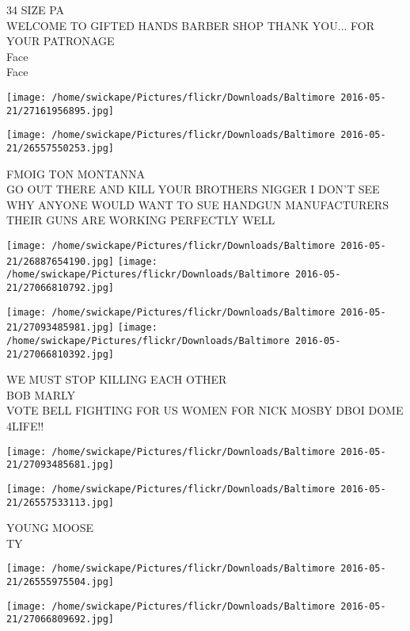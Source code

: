 \documentclass[10pt,letterpaper]{article}
\begin{document}
34 SIZE PA\\
WELCOME TO GIFTED HANDS BARBER SHOP THANK YOU... FOR YOUR PATRONAGE\\
Face\\
Face\\
\pagebreak

\texttt{[image: /home/swickape/Pictures/flickr/Downloads/Baltimore 2016-05-21/27161956895.jpg]}

\vspace{0.25in}
\texttt{[image: /home/swickape/Pictures/flickr/Downloads/Baltimore 2016-05-21/26557550253.jpg]}

FMOIG TON MONTANNA\\
GO OUT THERE AND KILL YOUR BROTHERS NIGGER I DON'T SEE WHY ANYONE WOULD WANT TO SUE HANDGUN MANUFACTURERS THEIR GUNS ARE WORKING PERFECTLY WELL\\
\pagebreak

\texttt{[image: /home/swickape/Pictures/flickr/Downloads/Baltimore 2016-05-21/26887654190.jpg]}
\texttt{[image: /home/swickape/Pictures/flickr/Downloads/Baltimore 2016-05-21/27066810792.jpg]}

\texttt{[image: /home/swickape/Pictures/flickr/Downloads/Baltimore 2016-05-21/27093485981.jpg]}
\texttt{[image: /home/swickape/Pictures/flickr/Downloads/Baltimore 2016-05-21/27066810392.jpg]}

WE MUST STOP KILLING EACH OTHER\\
BOB MARLY\\
VOTE BELL FIGHTING FOR US WOMEN FOR NICK MOSBY DBOI DOME\\
4LIFE!!\\
\pagebreak

\texttt{[image: /home/swickape/Pictures/flickr/Downloads/Baltimore 2016-05-21/27093485681.jpg]}

\vspace{0.25in}
\texttt{[image: /home/swickape/Pictures/flickr/Downloads/Baltimore 2016-05-21/26557533113.jpg]}

YOUNG MOOSE\\
TY\\
\pagebreak

\texttt{[image: /home/swickape/Pictures/flickr/Downloads/Baltimore 2016-05-21/26555975504.jpg]}

\vspace{0.25in}
\texttt{[image: /home/swickape/Pictures/flickr/Downloads/Baltimore 2016-05-21/27066809692.jpg]}
\end{document}
